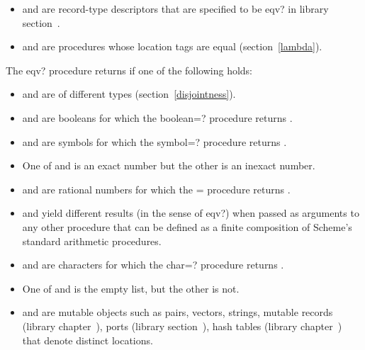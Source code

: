 \begin{entry}{%
}
\begin{itemize}
\item {} and  are record-type descriptors that are
  specified to be {\cf eqv?} in library
  section~.

\item {} and  are procedures whose location tags are
equal (section~\ref{lambda}).
\end{itemize}

The {\cf eqv?} procedure returns \schfalse{} if one of the following holds:

\begin{itemize}
\item {} and  are of different types
(section~\ref{disjointness}).

\item {} and  are booleans for which the {\cf
    boolean=?} procedure returns \schfalse.

\item {} and  are symbols for which the {\cf
    symbol=?} procedure returns \schfalse.

\item One of  and  is an exact number but the other is
        an inexact number.

\item {} and  are rational numbers for which the {\cf =} procedure
  returns \schfalse{}.

\item {} and  yield different results (in the sense of
  {\cf eqv?}) when passed as arguments to any other procedure
  that can be defined as a finite composition of Scheme's
  standard arithmetic procedures.

\item {} and  are characters for which the {\cf char=?}
  procedure returns \schfalse{}.

\item One of  and  is the empty list, but the other is not.

\item {} and  are mutable objects such as pairs,
  vectors, strings, mutable records (library
  chapter~), ports (library
  section~), hash tables (library
  chapter~) that denote
  distinct locations.


\end{itemize}
\end{entry}
